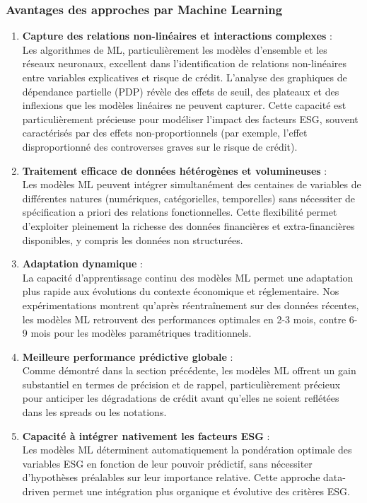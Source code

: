 \subsubsection{Avantages des approches par Machine Learning}

\begin{enumerate}
  \item \textbf{Capture des relations non-linéaires et interactions complexes} : \\
  Les algorithmes de ML, particulièrement les modèles d'ensemble et les réseaux neuronaux, excellent dans l'identification de relations non-linéaires entre variables explicatives et risque de crédit. L'analyse des graphiques de dépendance partielle (PDP) révèle des effets de seuil, des plateaux et des inflexions que les modèles linéaires ne peuvent capturer. Cette capacité est particulièrement précieuse pour modéliser l'impact des facteurs ESG, souvent caractérisés par des effets non-proportionnels (par exemple, l'effet disproportionné des controverses graves sur le risque de crédit).

  \item \textbf{Traitement efficace de données hétérogènes et volumineuses} : \\
  Les modèles ML peuvent intégrer simultanément des centaines de variables de différentes natures (numériques, catégorielles, temporelles) sans nécessiter de spécification a priori des relations fonctionnelles. Cette flexibilité permet d'exploiter pleinement la richesse des données financières et extra-financières disponibles, y compris les données non structurées.

  \item \textbf{Adaptation dynamique} : \\
  La capacité d'apprentissage continu des modèles ML permet une adaptation plus rapide aux évolutions du contexte économique et réglementaire. Nos expérimentations montrent qu'après réentraînement sur des données récentes, les modèles ML retrouvent des performances optimales en 2-3 mois, contre 6-9 mois pour les modèles paramétriques traditionnels.

  \item \textbf{Meilleure performance prédictive globale} : \\
  Comme démontré dans la section précédente, les modèles ML offrent un gain substantiel en termes de précision et de rappel, particulièrement précieux pour anticiper les dégradations de crédit avant qu'elles ne soient reflétées dans les spreads ou les notations.

  \item \textbf{Capacité à intégrer nativement les facteurs ESG} : \\
  Les modèles ML déterminent automatiquement la pondération optimale des variables ESG en fonction de leur pouvoir prédictif, sans nécessiter d'hypothèses préalables sur leur importance relative. Cette approche data-driven permet une intégration plus organique et évolutive des critères ESG.
\end{enumerate}

